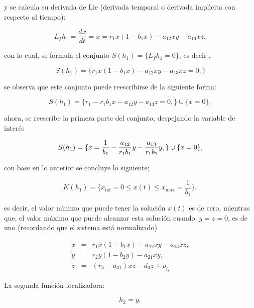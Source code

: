 \documentclass[letterpaper,11pt]{article}
\begin{document}
y se calcula su derivada de Lie (derivada temporal o derivada impl\'{\i}cita
con respecto al tiempo):

\begin{equation*}
L_{f}h_{1}=\frac{dx}{dt}=\dot{x}=r_{1}x(1-b_{1}x)-a_{12}xy-a_{13}xz,
\end{equation*}

con lo cual, se formula el conjunto $S(h_{1})=\{L_{f}h_{1}=0\}$, es decir ,

\begin{equation*}
S(h_{1})=\{r_{1}x(1-b_{1}x)-a_{12}xy-a_{13}xz=0,\}
\end{equation*}

se observa que este conjunto puede reescribirse de la siguiente forma:

\begin{equation*}
S(h_{1})=\{r_{1}-r_{1}b_{1}x-a_{12}y-a_{13}z=0,\}\cup \{x=0\},
\end{equation*}

ahora, se reescribe la primera parte del conjunto, despejando la variable de
inter\'{e}s

\begin{equation*}
S(h_{1})=\{x=\frac{1}{b_{1}}-\frac{a_{12}}{r_{1}b_{1}}y-\frac{a_{13}}{%
r_{1}b_{1}}y,\}\cup \{x=0\},
\end{equation*}

con base en lo anterior se concluye lo siguiente;

\begin{equation*}
K(h_{1})=\{x_{\inf }=0\leq x(t)\leq x_{\max }=\frac{1}{b_{1}}\},
\end{equation*}

es decir, el valor m\'{\i}nimo que puede tener la soluci\'{o}n $x(t)$ es de
cero, mientras que, el valor m\'{a}ximo que puede alcanzar esta soluci\'{o}n
cuando $\ y=z=0$, es de uno (recordando que el sistema est\'{a} normalizado)

\begin{eqnarray*}
\dot{x} &=&r_{1}x(1-b_{1}x)-a_{12}xy-a_{13}xz, \\
\dot{y} &=&r_{2}y(1-b_{2}y)-a_{21}xy, \\
\dot{z} &=&(r_{3}-a_{31})xz-d_{3}z+\rho _{i,}
\end{eqnarray*}

\bigskip

La segunda funci\'{o}n localizadora:

\begin{equation*}
h_{2}=y,
\end{equation*}
\end{document}

